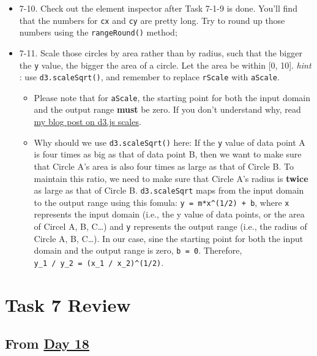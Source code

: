 \documentclass[
]{book}
\begin{document}
\begin{itemize}
\item
  7-10. Check out the element inspector after Task 7-1-9 is done. You'll find that the numbers for \texttt{cx} and \texttt{cy} are pretty long. Try to round up those numbers using the \texttt{rangeRound()} method;
\item
  7-11. Scale those circles by area rather than by radius, such that the bigger the \texttt{y} value, the bigger the area of a circle. Let the area be within {[}0, 10{]}. \emph{hint} : use \texttt{d3.scaleSqrt()}, and remember to replace \texttt{rScale} with \texttt{aScale}.

  \begin{itemize}
  \item
    Please note that for \texttt{aScale}, the starting point for both the input domain and the output range \textbf{must} be zero. If you don't understand why, read \href{https://hongtaoh.com/en/2020/09/07/d3-scales/}{my blog post on d3.js scales}.
  \item
    Why should we use \texttt{d3.scaleSqrt()} here: If the \texttt{y} value of data point A is four times as big as that of data point B, then we want to make sure that Circle A's area is also four times as large as that of Circle B. To maintain this ratio, we need to make sure that Circle A's radius is \textbf{twice} as large as that of Circle B. \texttt{d3.scaleSqrt} maps from the input domain to the output range using this fomula: \texttt{y\ =\ m*x\^{}(1/2)\ +\ b}, where \texttt{x} represents the input domain (i.e., the y value of data points, or the area of Circel A, B, C\ldots) and \texttt{y} represents the output range (i.e., the radius of Circle A, B, C\ldots). In our case, sine the starting point for both the input domain and the output range is zero, \texttt{b\ =\ 0}. Therefore, \texttt{y\_1\ /\ y\_2\ =\ (x\_1\ /\ x\_2)\^{}(1/2)}.
  \end{itemize}
\end{itemize}

\hypertarget{task-7-review}{%
\section{Task 7 Review}\label{task-7-review}}

\hypertarget{from-day-18}{%
\subsection{\texorpdfstring{From \href{https://observablehq.com/@hongtaoh/day-eighteen-sept-11-2020}{Day 18}}{From Day 18}}\label{from-day-18}}
\end{document}
